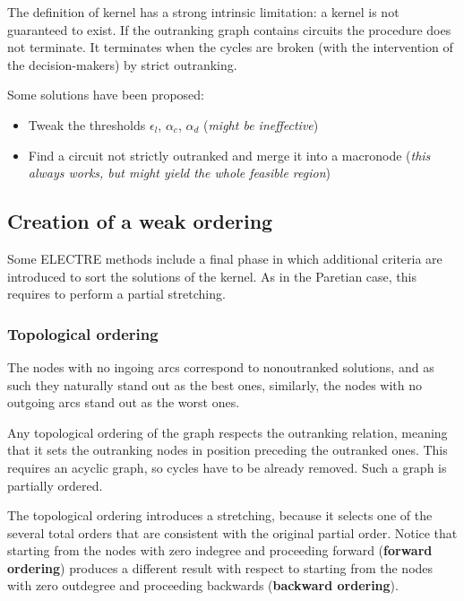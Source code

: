 The definition of kernel has a strong intrinsic limitation: a kernel is not guaranteed to exist. If the outranking graph contains circuits the procedure does not terminate. It terminates when the cycles are broken (with the intervention of the decision-makers) by strict outranking.

Some solutions have been proposed: 
\begin{itemize}
	\item Tweak the thresholds $\epsilon_l$, $\alpha_c$, $\alpha_d$ (\textit{might be ineffective})
	
	\item Find a circuit not strictly outranked and merge it into a macronode (\textit{this always works, but might yield the whole feasible region})
\end{itemize}

\subsection{Creation of a weak ordering}

Some ELECTRE methods include a final phase in which additional criteria are introduced to sort the solutions of the kernel. As in the Paretian case, this requires to perform a partial stretching.

\subsubsection{Topological ordering}

The nodes with no ingoing arcs correspond to nonoutranked solutions, and as such they naturally stand out as the best ones, similarly, the nodes with no outgoing arcs stand out as the worst ones.

Any topological ordering of the graph respects the outranking relation, meaning that it sets the outranking nodes in position preceding the outranked ones. This requires an acyclic graph, so cycles have to be already removed. Such a graph is partially ordered.

The topological ordering introduces a stretching, because it selects one of the several total orders that are consistent with the original partial order. Notice that starting from the nodes with zero indegree and proceeding forward (\textbf{forward ordering}) produces a different result with respect to starting from the nodes with zero outdegree and proceeding backwards (\textbf{backward ordering}).

